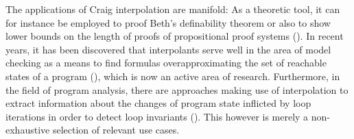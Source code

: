 The applications of Craig interpolation are manifold:
As a theoretic tool, it can for instance be employed to proof Beth's definability theorem or also to show lower bounds on the length of proofs of propositional proof systems (\cite{Pudlak97,krajivcek1997interpolation}).
In recent years, it has been discovered that interpolants serve well in the area of model checking as a means to find formulas overapproximating the set of reachable states of a program (\cite{McMillan03}), which is now an active area of research.
Furthermore, in the field of program analysis, there are approaches making use of interpolation to extract information about the changes of program state inflicted by loop iterations in order to detect loop invariants  (\cite{weissenbacher2010}).
This however is merely a non-exhaustive selection of relevant use cases.


